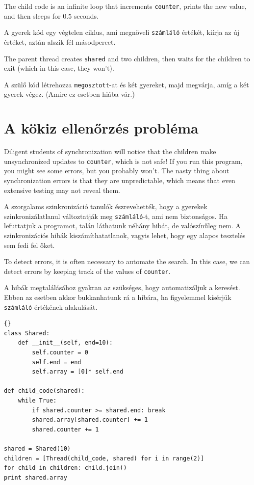 \documentclass{book}
\begin{document}
The child code is an infinite loop that increments {\tt counter},
prints the new value, and then sleeps for 0.5 seconds.

A gyerek kód egy végtelen ciklus, ami megnöveli {\tt számláló}
értékét, kiírja az új értéket, aztán alszik fél másodpercet.

The parent thread creates {\tt shared} and two children,
then waits for the children to exit (which in this case, they won't).

A szülő kód létrehozza {\tt megosztott}-at és két gyereket, majd
megvárja, amíg a két gyerek végez. (Amire ez esetben hiába vár.)

\section{A kökiz ellenőrzés probléma}

Diligent students of synchronization will notice that the
children make unsynchronized updates to {\tt counter}, which
is not safe!  If you run this program, you might see some
errors, but you probably won't.  The nasty thing about synchronization
errors is that they are unpredictable, which means that even
extensive testing may not reveal them.

A szorgalams szinkronizáció tanulók észrevehették, hogy a gyerekek
szinkronizálatlanul változtatják meg {\tt számláló}-t, ami nem biztonságos.
Ha lefuttatjuk a programot, talán láthatunk néhány hibát, de valószínűleg nem.
A szinkronizációs hibák kiszámíthatatlanok, vagyis lehet, hogy
egy alapos tesztelés sem fedi fel őket.

To detect errors, it is often necessary to automate the search.
In this case, we can detect errors by keeping track of the values
of {\tt counter}.

A hibák megtalálásához gyakran az szükséges, hogy automatizáljuk
a keresést. Ebben az esetben akkor bukkanhatunk rá a hibára, ha
figyelemmel kísérjük {\tt számláló} értékének alakulását.

\begin{lstlisting}[title={}]{}
class Shared:
    def __init__(self, end=10):
        self.counter = 0
        self.end = end
        self.array = [0]* self.end

def child_code(shared):
    while True:
        if shared.counter >= shared.end: break
        shared.array[shared.counter] += 1
        shared.counter += 1

shared = Shared(10)
children = [Thread(child_code, shared) for i in range(2)]
for child in children: child.join()
print shared.array
\end{lstlisting}
\end{document}
